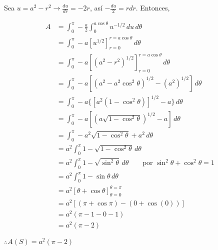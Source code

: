 \documentclass[12pt]{exam}
\begin{document}
\begin{questions}
\begin{enumerate}[a)]
\begin{enumerate}
      Sea $u=a^2-r^2 \rightarrow \frac{du}{dr}=-2r$, así $-\frac{du}{2}=rdr$. Entonces,

      \begin{align*}
        A
        &= \int_{0}^{\pi} -\frac{a}{2}\int_0^{a\cos{\theta}} u^{-1/2}\,du\,d\theta \\
        &= \int_{0}^{\pi} -a  [u^{1/2}]_{r=0}^{r=a\cos{\theta}} \,d\theta \\
        &= \int_{0}^{\pi} -a  [(a^2-r^2)^{1/2}]_{r=0}^{r=a\cos{\theta}} \,d\theta \\
        &= \int_{0}^{\pi} -a  [(a^2-a^2\cos^2{\theta})^{1/2} - (a^2)^{1/2}]\,d\theta \\
        &= \int_{0}^{\pi} -a  \{[a^2(1-\cos^2{\theta})]^{1/2} - a\}\,d\theta \\
        &= \int_{0}^{\pi} -a  [(a\sqrt{1-\cos^2{\theta}})^{1/2} - a]\,d\theta \\
        &= \int_{0}^{\pi} -a^2 \sqrt{1-\cos^2{\theta}} + a^2 \,d\theta \\
        &= a^2\int_{0}^{\pi} 1 - \sqrt{1-\cos^2{\theta}}  \,d\theta \\
        &= a^2 \int_{0}^{\pi} 1 - \sqrt{\sin^2{\theta}}  \,d\theta \qquad \text{por }\sin^2{\theta}+\cos^2{\theta}=1\\
        &= a^2 \int_{0}^{\pi} 1 - \sin{\theta}  \,d\theta \\
        &= a^2 \left[ \theta + \cos{\theta}  \right]_{\theta=0}^{\theta=\pi} \\
        &= a^2 \left[ \left(\pi + \cos{\pi}\right) -  \left(0 + \cos{\left(0\right)}\right) \right] \\
        &= a^2 (\pi -1-0-1) \\
        &= a^2(\pi-2)
      \end{align*}

      $\therefore A(S)=a^2(\pi-2)$
      
    \end{enumerate}
    
  \end{enumerate}









  
  
  

  
  
\end{questions}
\vskip30pt
\RaggedRight

\newpage



\pagestyle{foot}    %
\end{document}

